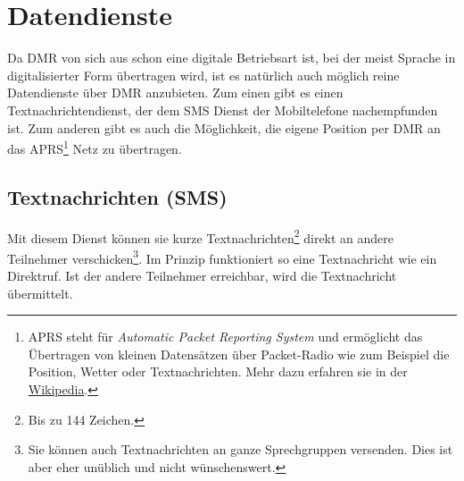 \section{Datendienste} \label{sec:data}
Da DMR von sich aus schon eine digitale Betriebsart ist, bei der meist Sprache in digitalisierter Form übertragen wird, ist es natürlich auch möglich reine Datendienste über DMR anzubieten. Zum einen gibt es einen Textnachrichtendienst, der dem SMS Dienst der Mobiltelefone nachempfunden ist. Zum anderen gibt es auch die Möglichkeit, die eigene Position per DMR an das APRS\footnote{APRS steht für \emph{Automatic Packet Reporting System} und ermöglicht das Übertragen von kleinen Datensätzen über Packet-Radio wie zum Beispiel die Position, Wetter oder Textnachrichten. Mehr dazu erfahren sie in der \href{https://de.wikipedia.org/wiki/Automatic_Packet_Reporting_System}{Wikipedia}.} Netz zu übertragen.
 
\subsection{Textnachrichten (SMS)} \label{sec:textmsg}
Mit diesem Dienst können sie kurze Textnachrichten\footnote{Bis zu 144 Zeichen.} direkt an andere Teilnehmer verschicken\footnote{Sie können auch Textnachrichten an ganze Sprechgruppen versenden. Dies ist aber eher unüblich und nicht wünschenswert.}. Im Prinzip funktioniert so eine Textnachricht wie ein Direktruf. Ist der andere Teilnehmer erreichbar, wird die Textnachricht übermittelt. 

